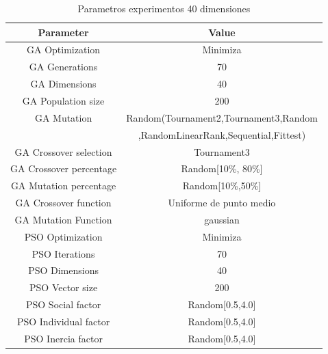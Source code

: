 \documentclass[runningheads]{llncs}
\begin{document}
    \begin{table}[htp]
      \caption{Parametros experimentos 40 dimensiones}
      \label{table:ga-pso-parameters-20}
      \centering
      \begin{tabular}{|c|c|}
      \hline
      Parameter & Value \\
      \hline
      \hline
      GA Optimization& Minimiza \\
      \hline
      GA Generations & 70 \\
      \hline
      GA Dimensions & 40 \\
      \hline
      GA Population size & 200 \\
      \hline
      GA Mutation & Random(Tournament2,Tournament3,Random \\
      &  ,RandomLinearRank,Sequential,Fittest)\\
      \hline
      GA Crossover selection & Tournament3 \\
      \hline
      GA Crossover percentage & Random[10\%, 80\%] \\
      \hline
      GA Mutation percentage & Random[10\%,50\%] \\
      \hline
      GA Crossover function & Uniforme de punto medio \\
      \hline
      GA Mutation Function & gaussian \\
      \hline
      PSO Optimization & Minimiza \\
      \hline
      PSO Iterations & 70 \\
      \hline
      PSO Dimensions & 40 \\
      \hline
      PSO Vector size& 200 \\
      \hline
      PSO Social factor & Random[0.5,4.0] \\
      \hline
      PSO Individual factor & Random[0.5,4.0] \\
      \hline
      PSO Inercia factor & Random[0.5,4.0] \\
      \hline
      \end{tabular}
      \end{table}
    

\end{document}
